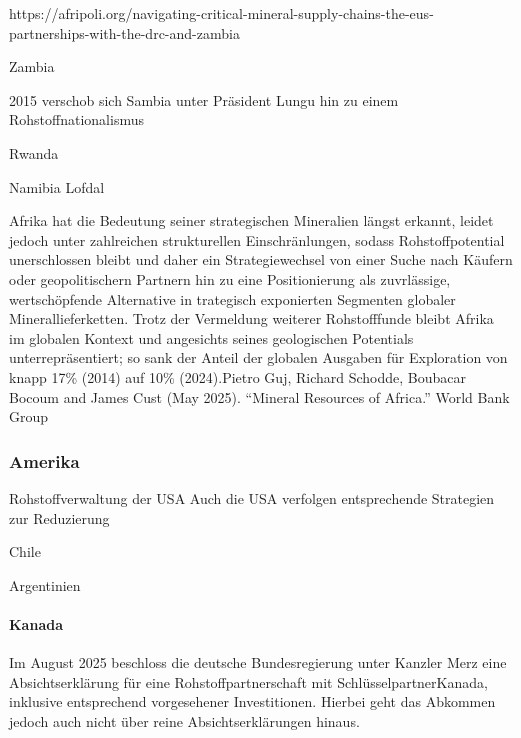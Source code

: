 \documentclass[12pt,a4paper,oneside]{book} %
\begin{document}
{https://afripoli.org/navigating-critical-mineral-supply-chains-the-eus-partnerships-with-the-drc-and-zambia

Zambia

2015 verschob sich Sambia unter Präsident Lungu hin zu einem Rohstoffnationalismus 

Rwanda

Namibia
Lofdal 



Afrika hat die Bedeutung seiner strategischen Mineralien längst erkannt, leidet jedoch unter zahlreichen strukturellen Einschränlungen, sodass Rohstoffpotential unerschlossen bleibt und daher ein Strategiewechsel von einer Suche nach Käufern oder geopolitischern Partnern hin zu eine Positionierung als zuvrlässige, wertschöpfende Alternative in trategisch exponierten Segmenten globaler Minerallieferketten.\autocite{Africa Finance Corporation, Compendium of Africa's Strategic Minerals, 2026. https://media.licdn.com/dms/document/media/v2/D4D1FAQGCjcEX3KiaWw/feedshare-document-sanitized-pdf/B4DZxWfvEqIwA8-/0/1770977690841?e=1771592400&v=beta&t=V0to1ZHBkPo_bF9kDtKsPxCe_HVGGcQOBAn6nfmzoxM } Trotz der Vermeldung weiterer Rohstofffunde bleibt Afrika im globalen Kontext und angesichts seines geologischen Potentials unterrepräsentiert; so sank der Anteil der globalen Ausgaben für Exploration von knapp 17\% (2014) auf 10\% (2024).\autocites{Africa Finance Corporation, Compendium of Africa's Strategic Minerals}{Pietro Guj, Richard Schodde, Boubacar Bocoum and James Cust (May 2025). “Mineral Resources of Africa.” World Bank Group}



\subsubsection{Amerika}
Rohstoffverwaltung der USA
Auch die USA verfolgen entsprechende Strategien zur Reduzierung 



Chile

Argentinien

\paragraph{Kanada}

Im August 2025 beschloss die deutsche Bundesregierung unter Kanzler Merz eine Absichtserklärung für eine Rohstoffpartnerschaft mit \glqq Schlüsselpartner\grqq Kanada, inklusive entsprechend vorgesehener Investitionen.\autocites{Stratmann, Handelsblatt, Deutschland plant Rohstoff-Deal mit Kanada}{Joint Declaration of Intent between Canada and Germany on Critical Minerals Cooperation} Hierbei geht das Abkommen jedoch auch nicht über reine Absichtserklärungen hinaus.

}
\end{document}
